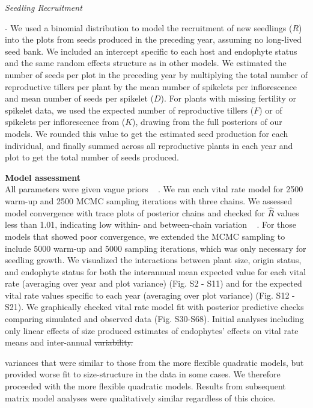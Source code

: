 \documentclass[lineno,sn-nature]{sn-jnl}%
\providecommand{\DIFadd}[1]{{\protect\color{blue}#1}} %
\providecommand{\DIFdel}[1]{{\protect\color{red}\protect\scriptsize\sout{#1}}}
\providecommand{\DIFadd}[1]{{\protect\color{blue}\uwave{#1}}} %
\providecommand{\DIFdel}[1]{{\protect\color{red}\sout{#1}}}                      %
\providecommand{\DIFaddbegin}{} %
\providecommand{\DIFaddend}{} %
\providecommand{\DIFdelbegin}{} %
\providecommand{\DIFdelend}{} %
\newcommand{\DIFscaledelfig}{0.5}
\newlength{\DIFdelgraphicswidth} %
\newlength{\DIFdelgraphicsheight} %
\newcommand{\DIFaddincludegraphics}[2][]{{\color{blue}\fbox{\DIFOincludegraphics[#1]{#2}}}} %
\newcommand{\DIFdelincludegraphics}[2][]{%
\sbox{\DIFdelgraphicsbox}{\DIFOincludegraphics[#1]{#2}}%
\settoboxwidth{\DIFdelgraphicswidth}{\DIFdelgraphicsbox} %
\settoboxtotalheight{\DIFdelgraphicsheight}{\DIFdelgraphicsbox} %
\scalebox{\DIFscaledelfig}{%
\parbox[b]{\DIFdelgraphicswidth}{\usebox{\DIFdelgraphicsbox}\\[-\baselineskip] \rule{\DIFdelgraphicswidth}{0em}}\llap{\resizebox{\DIFdelgraphicswidth}{\DIFdelgraphicsheight}{%
\setlength{\unitlength}{\DIFdelgraphicswidth}%
\begin{picture}(1,1)%
\thicklines\linethickness{2pt} %
{\color[rgb]{1,0,0}\put(0,0){\framebox(1,1){}}}%
{\color[rgb]{1,0,0}\put(0,0){\line( 1,1){1}}}%
{\color[rgb]{1,0,0}\put(0,1){\line(1,-1){1}}}%
\end{picture}%
}\hspace*{3pt}}} %
} %
\DeclareRobustCommand{\DIFaddbegin}{\DIFOaddbegin \let\includegraphics\DIFaddincludegraphics} %
\DeclareRobustCommand{\DIFaddend}{\DIFOaddend \let\includegraphics\DIFOincludegraphics} %
\DeclareRobustCommand{\DIFdelbegin}{\DIFOdelbegin \let\includegraphics\DIFdelincludegraphics} %
\DeclareRobustCommand{\DIFdelend}{\DIFOaddend \let\includegraphics\DIFOincludegraphics} %
\begin{document}
\begin{appendices}
\emph{\DIFadd{Seedling Recruitment}} \DIFadd{- We used a binomial distribution to model the recruitment of new seedlings ($R$) into the plots from seeds produced in the preceding year, assuming no long-lived seed bank. 
We included an intercept specific to each host and endophyte status and the same random effects structure as in other models. 
We estimated the number of seeds per plot in the preceding year by multiplying the total number of reproductive tillers per plant by the mean number of spikelets per inflorescence and mean number of seeds per spikelet ($D$).
For plants with missing fertility or spikelet data, we used the expected number of reproductive tillers ($F$) or of spikelets per inflorescence from ($K$), drawing from the full posteriors of our models. 
We rounded this value to get the estimated seed production for each individual, and finally summed across all reproductive plants in each year and plot to get the total number of seeds produced. 

}

\textbf{\DIFadd{Model assessment}}\\
\DIFadd{All parameters were given vague priors \mbox{%
\cite{gabry2019visualization}}\hspace{0pt}%
.
We ran each vital rate model for 2500 warm-up and 2500 MCMC sampling iterations with three chains. 
We assessed model convergence with trace plots of posterior chains and checked for $\hat{R}$ values less than 1.01, indicating low within- and between-chain variation \mbox{%
\cite{brooks1998general,gelman2006data}}\hspace{0pt}%
. 
For those models that showed poor convergence, we extended the MCMC sampling to include 5000 warm-up and 5000 sampling iterations, which was only necessary for seedling growth.
We visualized the interactions between plant size, origin status, and endophyte status for both the interannual mean expected value for each vital rate (averaging over year and plot variance) (Fig. S2 - S11) and for the expected vital rate values specific to each year (averaging over plot variance) (Fig. S12 -S21).
We graphically checked vital rate model fit with posterior predictive checks comparing simulated and observed data (Fig. S30-S68).
Initial analyses including only linear effects of size produced estimates of endophytes' effects on vital rate means and }\DIFaddend inter-annual \DIFdelbegin \DIFdel{variability.
}%
\DIFdelend \DIFaddbegin \DIFadd{variances that were similar to those from the more flexible quadratic models, but provided worse fit to size-structure in the data in some cases. 
We therefore proceeded with the more flexible quadratic models. 
Results from subsequent matrix model analyses were qualitatively similar regardless of this choice.

}
\end{appendices}
\end{document}

